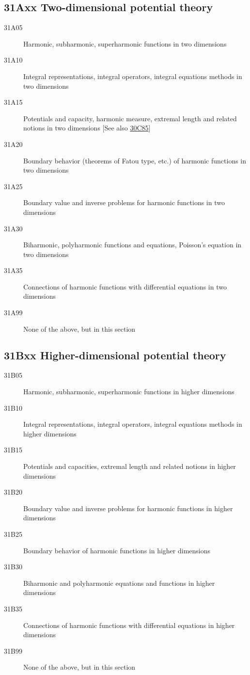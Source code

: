 \documentclass[letterpaper]{article}
\begin{document}
\subsection*{31Axx  Two-dimensional potential theory }\label{31Axx}
\begin{description}  
\item [31A05]\label{31A05} Harmonic, subharmonic, superharmonic functions in two dimensions
\item [31A10]\label{31A10} Integral representations, integral operators, integral equations methods in two dimensions
\item [31A15]\label{31A15} Potentials and capacity, harmonic measure, extremal length and related notions in two dimensions [See also \hyperref[30C85]{30C85}]
\item [31A20]\label{31A20} Boundary behavior (theorems of Fatou type, etc.) of harmonic functions in two dimensions
\item [31A25]\label{31A25} Boundary value and inverse problems for harmonic functions in two dimensions
\item [31A30]\label{31A30} Biharmonic, polyharmonic functions and equations, Poisson's equation in two dimensions
\item [31A35]\label{31A35} Connections of harmonic functions with differential equations in two dimensions
\item [31A99]\label{31A99} None of the above, but in this section
\end{description}
\subsection*{31Bxx  Higher-dimensional potential theory }\label{31Bxx}
\begin{description}  
\item [31B05]\label{31B05} Harmonic, subharmonic, superharmonic functions in higher dimensions
\item [31B10]\label{31B10} Integral representations, integral operators, integral equations methods in higher dimensions
\item [31B15]\label{31B15} Potentials and capacities, extremal length and related notions in higher dimensions
\item [31B20]\label{31B20} Boundary value and inverse problems for harmonic functions in higher dimensions
\item [31B25]\label{31B25} Boundary behavior of harmonic functions in higher dimensions
\item [31B30]\label{31B30} Biharmonic and polyharmonic equations and functions in higher dimensions
\item [31B35]\label{31B35} Connections of harmonic functions with differential equations in higher dimensions
\item [31B99]\label{31B99} None of the above, but in this section 
\end{description}
\end{document}
